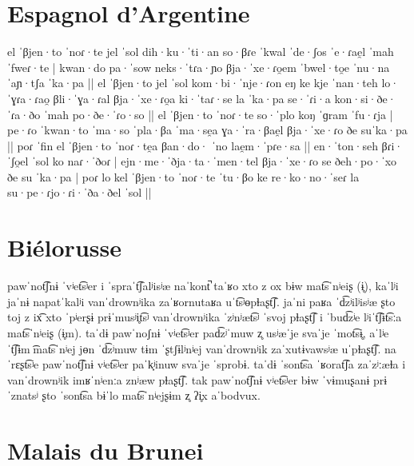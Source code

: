 \section[Espagnol d'Argentine]{Espagnol d'Argentine \parencite{colomaArgentineSpanish2018}\\ }

{el ˈβjen·to ˈnoɾ·te jel ˈsol dih·ku·ˈti·an so·βɾe ˈkwal ˈde·ʃos ˈe·ɾae̯l ˈmah ˈfweɾ·te | kwan·do pa·ˈsow neks·ˈtɾa·ɲo βja·ˈxe·ɾo̯em ˈbwel·to̯e ˈnu·na ˈaɲ·tʃa ˈka·pa || el ˈβjen·to jel ˈsol kom·bi·ˈnje·ɾon eŋ ke kje ˈnan·teh lo·ˈɣɾa·ɾao̯ βli·ˈɣa·ɾal βja·ˈxe·ɾo̯a ki·ˈtaɾ·se la ˈka·pa se·ˈɾi·a kon·si·ðe·ˈɾa·ðo ˈmah po·ðe·ˈɾo·so || el ˈβjen·to ˈnoɾ·te so·ˈplo koŋ ˈɡram ˈfu·ɾja | pe·ɾo ˈkwan·to ˈma·so ˈpla·βa ˈma·se̯a ɣa·ˈra·βae̯l βja·ˈxe·ɾo ðe suˈka·pa || poɾ ˈfin el ˈβjen·to ˈnoɾ·te̯a βan·do· ˈno lae̯m·ˈpɾe·sa || en·ˈton·seh βɾi·ˈʃo̯el ˈsol ko naɾ·ˈðoɾ | ejn·me·ˈðja·ta·ˈmen·tel βja·ˈxe·ɾo se ðeh·po·ˈxo ðe su ˈka·pa | poɾ lo kel ˈβjen·to ˈnoɾ·te ˈtu·βo ke re·ko·no·ˈseɾ la su·pe·ɾjo·ɾi·ˈða·ðel ˈsol ||}

\section[Biélorusse]{Biélorusse  \parencite{birdBelarusian2020}\\}


{pawˈnot͡ʃnɨ ˈvʲet͡sʲer i ˈspraˈt͡ʃalʲisʲæ naˈkont̚ taˈʁo xto z ox bɨw mat͡sˈnʲeiʂ (ɨ̥), kaˈlʲi
jaˈnɨ napatˈkalʲi vanˈdrownʲika zaˈʁornutaʁa uˈt͡sʲɵpɫaʂt͡ʃ. jaˈni paʁa ˈd͡zʲilʲisʲæ ʂto toj z
ix͡ xto ˈpʲerʂɨ prɨˈmusʲi̥t͡sʲ vanˈdrownʲika ˈzʲnʲæt͡sʲ ˈsvoj pɫaʂt͡ʃ i ˈbud͡zʲe lʲiˈt͡ʃɨt͡sːa mat͡sˈnʲeiʂ
(ɨ̥m). taˈdɨ pawˈnoʃnɨ ˈvʲet͡sʲer pad͡zʲˈmuw z̥ usʲæˈje svaˈje ˈmot͡sɨ̥, aˈlʲe ˈt͡ʃɨm ͡mat͡sˈnʲej jɵn
ˈd͡zʲmuw tɨm ˈʂtʃɨlʲnʲej vanˈdrownʲik zaˈxutɨvawsʲæ uˈpɫaʂt͡ʃ. naˈrɛʂt͡sʲe pawˈnot͡ʃnɨ vʲet͡sʲer
paˈk̟ʲinuw svaˈje ˈsprobɨ. taˈdɨ ˈsont͡sa ˈʁorat͡ʃa zaˈzʲːæɫa i vanˈdrownʲik imʁˈnʲenːa znʲæw
pɫaʂt͡ʃ. tak pawˈnot͡ʃnɨ vʲet͡sʲer bɨw ˈvɨmuʂanɨ prɨˈznatsʲ ʂto ˈsont͡sa bɨˈlo mat͡sˈnʲejʂɨm z̥ ʔi̥x
aˈbodvux.}\\


\section[Malais du Brunei]{Malais du Brunei \parencite{deterdingBruneiMalay2017}\\ }

